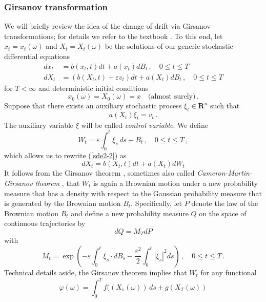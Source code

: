 \documentclass[]{tMPH2e}
\newcommand{\R}{{\mathbf R}}
\newcommand{\eps}{\varepsilon}
\newcommand{\wrt}{with respect to }
\begin{document}
\subsubsection*{Girsanov transformation}
We will briefly review the idea of the change of drift via Girsanov transformations; for details we refer to the textbook \cite{oksendal2003stochastic}. To this end, let $x_{t}=x_{t}(\omega)$ and $X_{t}=X_{t}(\omega)$ be the solutions of our generic stochastic differential equations
\begin{subequations}\label{sde2}
\begin{align}
dx_{t} & = b(x_{t},t)dt + a(x_{t})dB_{t}\,,\quad 0\le t\le T  \label{sde2-1}\\
dX_{t} & = (b(X_{t},t) + \eps v_{t})dt +a(X_{t})dB_{t}\,,\quad 0\le t\le T \label{sde2-2}
\end{align}
\end{subequations}
for $T<\infty$ and deterministic initial conditions
\[
x_{0}(\omega) = X_{0}(\omega) = x\quad\textrm{(almost surely)}\,.
\]
Suppose that there exists an auxiliary stochastic process $\xi_{t}\in\R^{n}$ such that 
\begin{equation}\label{xi}
a(X_{t})\xi_{t} = v_{t}\,.
\end{equation}
The auxiliary variable $\xi$ will be called \emph{control variable}. We define  
\[
W_{t} = \eps\int_{0}^{t}\xi_{s}\,ds + B_{t}\,,\quad 0\le t\le T\,,
\]
which allows us to rewrite (\ref{sde2-2}) as
\begin{equation}\label{sde2-3}
dX_{t} = b(X_{t},t)dt +a(X_{t})dW_{t} 
\end{equation}
It follows from the Girsanov theorem \cite[Thm.~8.6.8]{oksendal2003stochastic}, sometimes also called \emph{Cameron-Martin-Girsanov theorem} \cite{stroock2006}, that $W_{t}$ is again a Brownian motion under a new probability measure that has a density \wrt the Gaussian probability measure that is generated by the Brownian motion $B_{t}$. Specifically, let $P$ denote the law of the Brownian motion $B_{t}$ and define a new probability measure $Q$ on the space of continuous trajectories by 
\[
dQ=M_{T}dP
\]
with 
\begin{equation}\label{likelihood}
M_{t} = \exp\left(-\eps\int_{0}^{t}\xi_{s}\cdot dB_{s} - \frac{\eps^{2}}{2}\int_{0}^{t}|\xi_{s}|^{2}ds\right)\,,\quad 0\le t\le T\,.
\end{equation}
Technical details aside, the Girsanov theorem implies that $W_{t}$  for any functional 
\[
\varphi(\omega)=\int_{0}^{T}f((X_{s}(\omega))\,ds + g(X_{T}(\omega))
\] 
\end{document}
